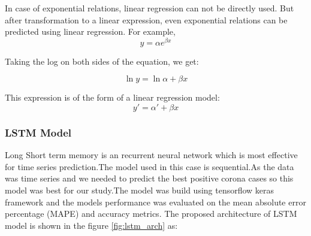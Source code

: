 In case of exponential relations, linear regression can not be directly used.
But after transformation to a linear expression, even exponential relations can
be predicted using linear regression. For example,
\begin{equation}
	y = \alpha e^{\beta x}
\end{equation}

Taking the log on both sides of the equation, we get:

\begin{equation}
	\ln y = \ln \alpha + \beta x
\end{equation}

This expression is of the form of a linear regression model:
\begin{equation}
	y\prime = \alpha \prime + \beta x
\end{equation}



\subsubsection{LSTM Model}

Long Short term memory is an recurrent neural network which is most effective for time
series prediction.The model used in this case is sequential.As the data was time series and
we needed to predict the best positive corona cases so this model was best for our study.The
model was build using tensorflow keras framework and the models performance was
evaluated on the mean absolute error percentage (MAPE) and accuracy metrics.
The proposed architecture of LSTM model is shown in the figure
\ref{fig:lstm_arch} as:

